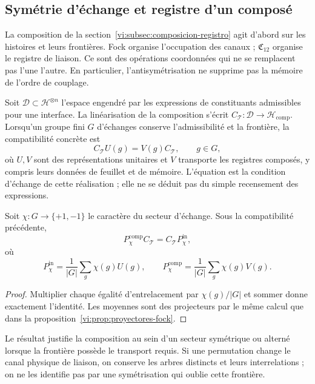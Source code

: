 \subsection{Symétrie d’échange et registre d’un composé}
\label{vi:subsec:pauli-composicion}

La composition de la section~\ref{vi:subsec:composicion-registro}
agit d’abord sur les histoires et leurs frontières. Fock organise
l’occupation des canaux ; \(\mathfrak C_{12}\) organise le
registre de liaison. Ce sont des opérations coordonnées qui ne se
remplacent pas l’une l’autre. En particulier, l’antisymétrisation ne
supprime pas la mémoire de l’ordre de couplage.

Soit \(\mathcal D\subset\mathcal H^{\otimes n}\) l’espace
engendré par les expressions de constituants admissibles pour une
interface. La linéarisation de la composition s’écrit
\(C_{\mathcal T}:\mathcal D\to\mathcal H_{\mathrm{comp}}\).
Lorsqu’un groupe fini \(G\) d’échanges conserve
l’admissibilité et la frontière, la compatibilité concrète est
\[
 C_{\mathcal T}U(g)=V(g)C_{\mathcal T},\qquad g\in G,
\]
où \(U,V\) sont des représentations unitaires et \(V\) transporte
les registres composés, y compris leurs données de feuillet et de mémoire.
L’équation est la condition
d’échange de cette réalisation ; elle ne se déduit pas du simple
recensement des expressions.

\begin{proposition}
\label{vi:prop:composicion-estadistica}
Soit \(\chi:G\to\{+1,-1\}\) le caractère du secteur
d’échange. Sous la compatibilité précédente,
\[
 P_\chi^{\mathrm{comp}}C_{\mathcal T}
 =C_{\mathcal T}P_\chi^{\mathrm{in}},
\]
où
\[
 P_\chi^{\mathrm{in}}=\frac1{|G|}\sum_g\chi(g)U(g),
 \qquad
 P_\chi^{\mathrm{comp}}=\frac1{|G|}\sum_g\chi(g)V(g).
\]
\end{proposition}
\begin{proof}
Multiplier chaque égalité d’entrelacement par
\(\chi(g)/|G|\) et sommer donne exactement l’identité.
Les moyennes sont des projecteurs par le même calcul que dans
la proposition~\ref{vi:prop:proyectores-fock}.
\end{proof}

Le résultat justifie la composition au sein d’un secteur symétrique
ou alterné lorsque la frontière possède le transport requis.
Si une permutation change le canal physique de liaison, on
conserve les arbres distincts et leurs interrelations ; on ne les
identifie pas par une symétrisation qui oublie cette frontière.

